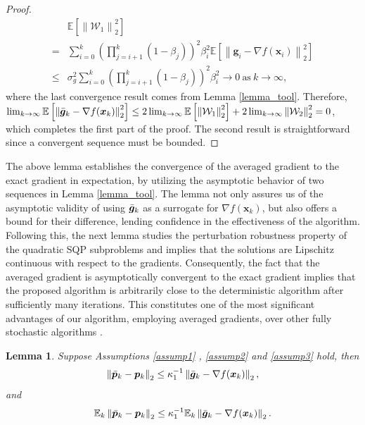 \documentclass[aos]{imsart}
\numberwithin{equation}{section}
\theoremstyle{plain}
\newtheorem{lemma}{Lemma}
\begin{document}
\begin{appendix}
\begin{proof}
\begin{equation*}
\begin{split}
            & \mathbb{E}\left[ \left\|\mathcal{W}_1\right\|_2^2 \right] \\
            = & \sum_{i=0}^{k} \left( \prod_{j=i+1}^{k} (1-\beta_j) \right)^2 \beta_i^2 \mathbb{E}\left[ \left\| \bm{g}_{i} - \nabla f(\bm{x}_{i}) \right\|_2^2 \right] \\
        \leq & \sigma_{g}^2 \sum_{i=0}^{k} \left( \prod_{j=i+1}^{k} (1-\beta_j ) \right)^2 \beta_i^2 \to 0 ~\text{as}~ k \to \infty,
        \end{split}
    \end{equation*}
    where the last convergence result comes from Lemma \ref{lemma_tool}. Therefore,   $\lim_{k \to \infty}\mathbb{E} \left[\left\| \Bar{\bm{g}}_{k} - \nabla f(\bm{x}_k) \right\|_2^2 \right] \leq 2\lim_{k \to \infty}\mathbb{E} \left[ \left\|\mathcal{W}_1\right\|_2^2 \right] + 2 \lim_{k \to \infty} \left\|\mathcal{W}_2\right\|_2^2 = 0$, which completes the first part of the proof. The second result is straightforward since a convergent sequence must be bounded.
\end{proof}


The above lemma establishes the convergence of the averaged gradient to the exact gradient in expectation, by utilizing the asymptotic behavior of two sequences in Lemma \ref{lemma_tool}. The lemma not only assures us of the asymptotic validity of using $\Bar{\bm{g}}_k$ as a surrogate for $\nabla f(\bm{x}_k)$, but also offers a bound for their difference, lending confidence in the effectiveness of the algorithm. Following this, the next lemma studies the perturbation robustness property of the quadratic SQP subproblems and implies that the solutions are Lipschitz continuous with respect to the gradients. Consequently, the fact that the averaged gradient is asymptotically convergent to the exact gradient implies that the proposed algorithm is arbitrarily close to the deterministic algorithm after sufficiently many iterations. This constitutes one of the most significant advantages of our algorithm, employing averaged gradients, over other fully stochastic algorithms \cite{berahas2021sequential, curtis2023sequential}.


\begin{lemma}
\label{lemma19}
    Suppose Assumptions \ref{assump1} , \ref{assump2} and \ref{assump3} hold, then  
    \begin{equation}
        \left\| \Bar{\bm{p}}_k - \bm{p}_k \right\|_2 \leq \kappa_1^{-1} \left\| \Bar{\bm{g}}_{k} - \nabla f(\bm{x}_k)  \right\|_2,
    \end{equation}
    and
    \begin{equation*}
        \mathbb{E}_k \left\| \Bar{\bm{p}}_k - \bm{p}_k \right\|_2 \leq \kappa_1^{-1} \mathbb{E}_k \left\|\Bar{\bm{g}}_{k} - \nabla f(\bm{x}_k)  \right\|_2.
    \end{equation*}
\end{lemma}


\end{appendix}
\end{document}

